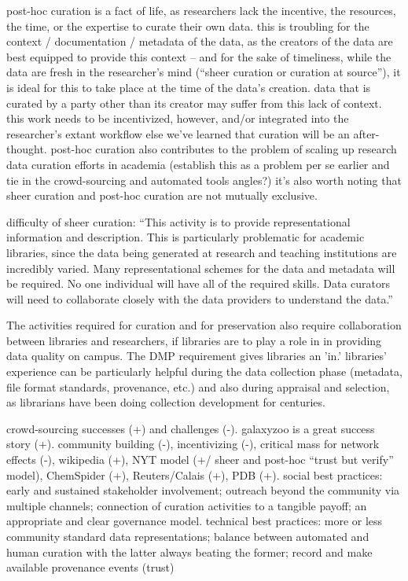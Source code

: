 \documentclass{acm_proc_article-sp}
\begin{document}
post-hoc curation is a fact of life, as researchers lack the
incentive, the resources, the time, or the expertise to curate their
own data. this is troubling for the context / documentation / metadata
of the data, as the creators of the data are best equipped to provide
this context -- and for the sake of timeliness, while the data are
fresh in the researcher's mind (``sheer curation or curation at
source''\cite{curry:community}), it is ideal for this to take place at
the time of the data's creation.  data that is curated by a party
other than its creator may suffer from this lack of context.  this
work needs to be incentivized, however, and/or integrated into the
researcher's extant workflow else we've learned that curation will be
an after-thought. post-hoc curation also contributes to the problem of
scaling up\cite{curry:community} research data curation efforts in
academia (establish this as a problem per se earlier and tie in the
crowd-sourcing and automated tools angles?) it's also worth noting
that sheer curation and post-hoc curation are not mutually exclusive.

difficulty of sheer curation: ``This activity is to provide
representational information and description. This is particularly
problematic for academic libraries, since the data being generated at
research and teaching institutions are incredibly varied. Many
representational schemes for the data and metadata will be
required. No one individual will have all of the required skills. Data
curators will need to collaborate closely with the data providers to
understand the data.'' \cite{heidorn:libraries}

The activities required for curation and for preservation also require
collaboration between libraries and researchers, if libraries are to
play a role in in providing data quality on campus. The DMP
requirement gives libraries an 'in.' libraries' experience can be
particularly helpful during the data collection phase (metadata, file
format standards, provenance, etc.) and also during appraisal and
selection, as librarians have been doing collection development for
centuries.

crowd-sourcing successes (+) and challenges (-). galaxyzoo is a great
success story (+). community building (-), incentivizing (-), critical
mass for network effects (-), wikipedia (+), NYT model (+/ sheer and
post-hoc ``trust but verify'' model), ChemSpider (+), Reuters/Calais
(+), PDB (+).  social best practices\cite{curry:community}: early and
sustained stakeholder involvement; outreach beyond the community via
multiple channels; connection of curation activities to a tangible
payoff; an appropriate and clear governance model. technical best
practices: more or less community standard data representations;
balance between automated and human curation with the latter always
beating the former; record and make available provenance events
(trust)
\end{document}
